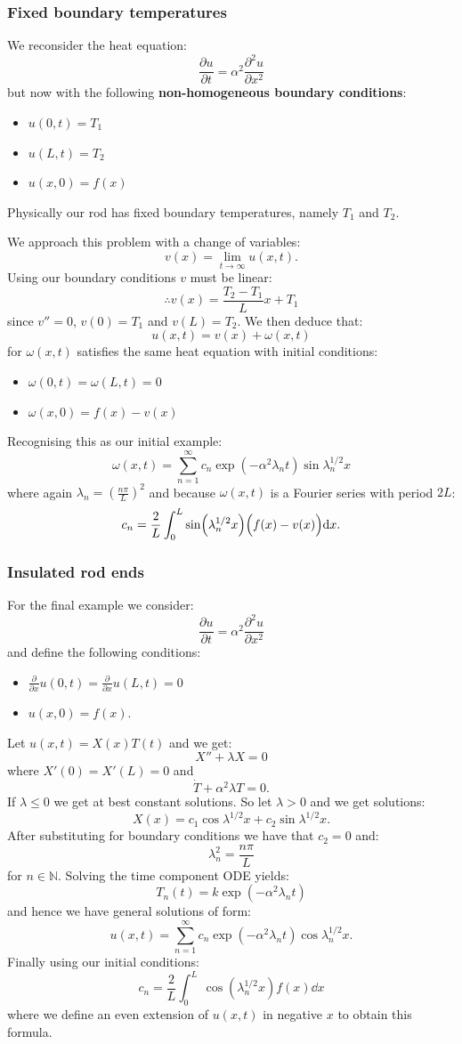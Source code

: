 \documentclass{article}
\begin{document}
\newpage

\subsubsection{Fixed boundary temperatures}
We reconsider the heat equation:
$$\frac{\partial u}{\partial t}=\alpha^2\frac{\partial^2 u}{\partial x^2}$$
but now with the following \textbf{non-homogeneous boundary conditions}:
\begin{itemize}
    \item $u(0,t)=T_1$
    \item $u(L,t)=T_2$
    \item $u(x,0)=f(x)$
\end{itemize}
Physically our rod has fixed boundary temperatures, namely $T_1$ and $T_2$.

We approach this problem with a change of variables:
$$v(x)=\lim_{t\rightarrow\infty}u(x,t).$$
Using our boundary conditions $v$ must be linear:
$$\therefore v(x)=\frac{T_2-T_1}{L}x+T_1$$
since $v''=0$, $v(0)=T_1$ and $v(L)=T_2$. We then deduce that:
$$u(x,t)=v(x)+\omega(x,t)$$
for $\omega(x,t)$ satisfies the same heat equation with initial conditions:
\begin{itemize}
    \item $\omega(0,t)=\omega(L,t)=0$
    \item $\omega(x,0)=f(x)-v(x)$
\end{itemize}
Recognising this as our initial example:
$$\omega(x,t)
=\sum_{n=1}^{\infty}c_n\exp\left(-\alpha^2\lambda_n t\right)
\sin\lambda_n^{1/2} x$$
where again $\lambda_n=\left(\frac{n\pi}{L}\right)^2$ and because $\omega(x,t)$ is a Fourier series with period $2L$:
$$c_n=\frac{2}{L}\int_{0}^{L}\sin(\lambda_n^{1/2} x)\Bigl(f(x)-v(x)\Bigr)\dd x.$$

\newpage

\subsubsection{Insulated rod ends}
For the final example we consider:
$$\frac{\partial u}{\partial t}=\alpha^2\frac{\partial^2 u}{\partial x^2}$$
and define the following conditions:
\begin{itemize}
    \item $\displaystyle\frac{\partial}{\partial x}u(0,t)
    =\displaystyle\frac{\partial}{\partial x}u(L,t)=0$
    \item $u(x,0)=f(x)$.
\end{itemize}
Let $u(x,t)=X(x)T(t)$ and we get:
$$X''+\lambda X=0$$
where $X'(0)=X'(L)=0$ and
$$\dot{T}+\alpha^2\lambda T=0.$$
If $\lambda\leq0$ we get at best constant solutions.
So let $\lambda>0$ and we get solutions:
$$X(x)=c_1\cos\lambda^{1/2}x+c_2\sin\lambda^{1/2}x.$$
After substituting for boundary conditions we have that $c_2=0$ and:
$$\lambda_n^2=\frac{n\pi}{L}$$
for $n\in\mathbb{N}$. Solving the time component ODE yields:
$$T_n(t)=k\exp(-\alpha^2\lambda_n t)$$
and hence we have general solutions of form:
$$u(x,t)=\sum_{n=1}^{\infty}c_n\exp(-\alpha^2\lambda_n t)
\cos\lambda_n^{1/2}x.$$
Finally using our initial conditions:
$$c_n=\frac{2}{L}\int_{0}^{L}\
\cos(\lambda_n^{1/2}x) f(x)\dd x$$
where we define an even extension of $u(x,t)$ in negative $x$
to obtain this formula.
\end{document}
